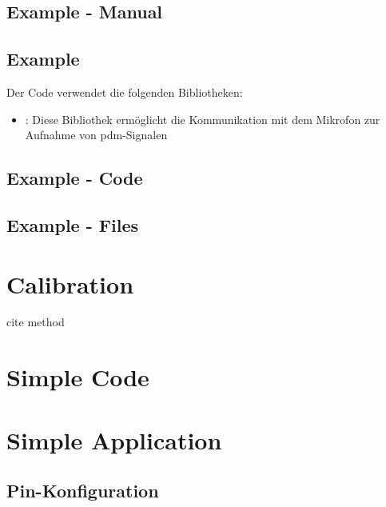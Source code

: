 \subsection{Example - Manual}

\subsection{Example}


Der Code verwendet die folgenden Bibliotheken:

\begin{itemize}
    \item {}: Diese Bibliothek ermöglicht die Kommunikation mit dem Mikrofon zur Aufnahme von \ac{pdm}-Signalen \cite{ArduinoPDM:2023} 
\end{itemize}



\subsection{Example - Code}

{
    \label{Nano:BuiltinLEDTest}
}

\subsection{Example - Files}


\section{Calibration}

cite method

\section{Simple Code}


\section{Simple Application}


\subsection{Pin-Konfiguration}


